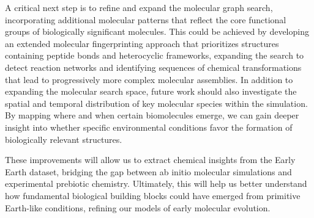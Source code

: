 A critical next step is to refine and expand the molecular graph search, incorporating additional molecular patterns that reflect the core functional groups of biologically significant molecules. This could be achieved by developing an extended molecular fingerprinting approach that prioritizes structures containing peptide bonds and heterocyclic frameworks, expanding the search to detect reaction networks and identifying sequences of chemical transformations that lead to progressively more complex molecular assemblies. In addition to expanding the molecular search space, future work should also investigate the spatial and temporal distribution of key molecular species within the simulation. By mapping where and when certain biomolecules emerge, we can gain deeper insight into whether specific environmental conditions favor the formation of biologically relevant structures.

These improvements will allow us to extract chemical insights from the Early Earth dataset, bridging the gap between ab initio molecular simulations and experimental prebiotic chemistry. Ultimately, this will help us better understand how fundamental biological building blocks could have emerged from primitive Earth-like conditions, refining our models of early molecular evolution.